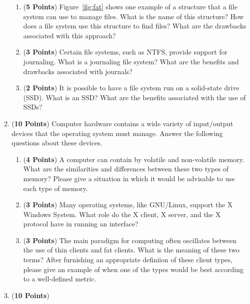 \documentclass[12pt,epsf,psfig,graphics]{article}
\begin{document}
\begin{enumerate}
\begin{enumerate}

  \item ({\bf 5 Points}) Figure~\ref{fig:fat} shows one example of a structure that a file system can use to manage
    files.  What is the name of this structure? How does a file system use this structure to find files?  What are the
    drawbacks associated with this approach?

  \item ({\bf 3 Points}) Certain file systems, such as NTFS, provide support for journaling.  What is a
    journaling file system?  What are the benefits and drawbacks associated with journals?

  \item ({\bf 2 Points}) It is possible to have a file system run on a solid-state drive (SSD).  What is an SSD?  What
    are the benefits associated with the use of SSDs? 

\end{enumerate}

\newpage

\item ({\bf 10 Points}) Computer hardware contains a wide variety of input/output devices that the operating system must
  manage.  Answer the following questions about these devices.

  \begin{enumerate}

    \item ({\bf 4 Points}) A computer can contain by volatile and non-volatile memory.  What are the similarities and
      differences between these two types of memory?  Please give a situation in which it would be advisable to use each
      type of memory.

    \item ({\bf 3 Points}) Many operating systems, like GNU/Linux, support the X Windows System.  What role do the X
      client, X server, and the X protocol have in running an interface?

    \item ({\bf 3 Points}) The main paradigm for computing often oscillates between the use of thin clients and fat
      clients.  What is the meaning of these two terms?  After furnishing an appropriate definiion of these client
      types, please give an example of when one of the types would be best according to a well-defined metric.

  \end{enumerate}

\item ({\bf 10 Points}) 

\end{enumerate}
\end{document}
